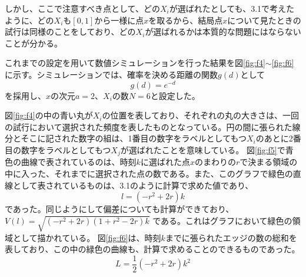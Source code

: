 しかし、ここで注意すべき点として、どの$X_{i}$が選ばれたとしても、3.1で考えたように、どの$X_{i}$も$[0,1]$から一様に点$x$を取るから、結局点$x$について見たときの試行は同様のことをしており、どの$X_{i}$が選ばれるかは本質的な問題にはならないことが分かる。

これまでの設定を用いて数値シミュレーションを行った結果を図\ref{fig:f4}$\sim$\ref{fig:f6}に示す。シミュレーションでは、確率を決める距離の関数$g(d)$として
$$g(d) = e^{-d}$$
を採用し、$x$の次元$a=2$、$X_{i}$の数$N=6$と設定した。

図\ref{fig:f4}の中の青い丸が$X_{i}$の位置を表しており、それぞれの丸の大きさは、一回の試行において選択された頻度を表したものとなっている。円の間に張られた線分とそこに記された数字の組は、1番目の数字をラベルとしてもつ$X_{i}$のあとに2番目の数字をラベルとしてもつ$X_{j}$が選ばれたことを意味している。
図\ref{fig:f5}で青色の曲線で表されているのは、時刻$k$に選ばれた点$x$のまわりの$r$で決まる領域の中に入った、それまでに選択された点の数である。また、このグラフで緑色の直線として表されているものは、3.1のように計算で求めた値であり、
$$l = (-r^{2} + 2r)k$$
であった。同じようにして偏差についても計算ができており、
$V(l) = \sqrt{(-r^{2} + 2r)(1+r^{2}-2r)k}$
である。これはグラフにおいて緑色の領域として描かれている。
図\ref{fig:f6}は、時刻$k$までに張られたエッジの数の総和を表しており、この中の緑色の曲線も、計算で求めることのできるものであった。
$$L = \frac{1}{2}(-r^{2} + 2r)k^{2}$$


